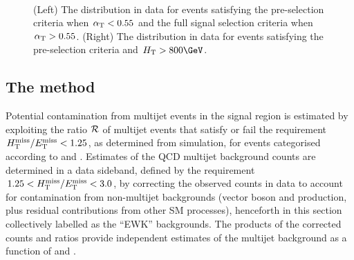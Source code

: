 \begin{figure}[!t]
 \centering
  \\
 \caption{(Left) The \alphat distribution in data for events
   satisfying the pre-selection criteria when $\alpha_{\text{T}} < 0.55$ and the
   full signal selection criteria when $\alpha_{\text{T}} > 0.55$. (Right) The
   \bdphi distribution in data for events satisfying the pre-selection
   criteria and $\scalht > 800\GeV$. 
 }
 \label{fig:alphat_bdphi_distr}
\end{figure}

\subsection{The method}
\label{sec:qcdMethod}

Potential contamination from multijet events in the signal region is
estimated by exploiting the ratio $\mbox{$\mathcal{R}$}$ of multijet events that
satisfy or fail the requirement $\mbox{$H_{\rm T}^{\rm miss}$}/\mbox{$E_\text{T}^{\rm miss}$} < 1.25$, as determined from
simulation, for events categorised according to \njet and
\scalht. Estimates of the QCD multijet background counts are
determined in a data sideband, defined by the requirement $1.25 <
\mbox{$H_{\rm T}^{\rm miss}$}/\mbox{$E_\text{T}^{\rm miss}$} < 3.0$, by correcting the observed counts in data to account
for contamination from non-multijet backgrounds (vector boson and
\ttbar production, plus residual contributions from other SM
processes), henceforth in this section collectively labelled as the
``EWK'' backgrounds. The products of the corrected counts and ratios
provide independent estimates of the multijet background as a function
of \njet and \scalht.

